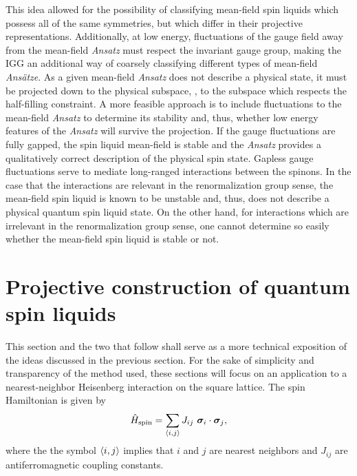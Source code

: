 This idea allowed for the possibility of classifying mean-field spin liquids which possess all of the same symmetries, but which differ in their projective representations.
Additionally, at low energy, fluctuations of the gauge field away from the mean-field \textit{Ansatz} must respect the invariant gauge group, making the IGG an additional way of coarsely classifying different types of mean-field \textit{Ans\"atze}.
As a given mean-field \textit{Ansatz} does not describe a physical state, it must be projected down to the physical subspace, \ie, to the subspace which respects the half-filling constraint.
A more feasible approach is to include fluctuations to the mean-field \textit{Ansatz} to determine its stability and, thus, whether low energy features of the \textit{Ansatz} will survive the projection.
If the gauge fluctuations are fully gapped, the spin liquid mean-field is stable and the \textit{Ansatz} provides a qualitatively correct description of the physical spin state.
Gapless gauge fluctuations serve to mediate long-ranged interactions between the spinons.
In the case that the interactions are relevant in the renormalization group sense, the mean-field spin liquid is known to be unstable and, thus, does not describe a physical quantum spin liquid state.
On the other hand, for interactions which are irrelevant in the renormalization group sense, one cannot determine so easily whether the mean-field spin liquid is stable or not.


%
\section{Projective construction of quantum spin liquids}
\label{section:chapter04_ProjectiveConstructionOfQuantumSpinLiquids}
%
This section and the two that follow shall serve as a more technical exposition of the ideas discussed in the previous section.
For the sake of simplicity and transparency of the method used, these sections will focus on an application to a nearest-neighbor Heisenberg interaction on the square lattice.
The spin Hamiltonian is given by
%
\begin{equation}
	\hat{H}_{\rm{spin}} = \sum_{\langle i,j \rangle} J_{ij}~\bm{\sigma}_i \cdot \bm{\sigma}_j,
	\label{eq:chapter04_HeisenbergHamiltonian}
\end{equation}
%
where the the symbol $\langle i,j \rangle$ implies that $i$ and $j$ are nearest neighbors and $J_{ij}$ are antiferromagnetic coupling constants.

